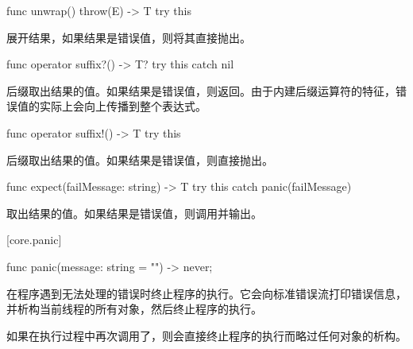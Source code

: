 \begin{itemdecl}
func unwrap() throw(E) -> T {
    try this
}
\end{itemdecl}

\pnum
{}展开结果，如果结果是错误值，则将其直接抛出。

\begin{itemdecl}
func operator suffix?() -> T? {
    try this catch { nil }
}
\end{itemdecl}

\pnum
后缀取出结果的值。如果结果是错误值，则返回。\enternote 由于内建后缀运算符的特征，错误值的实际上会向上传播到整个表达式。\exitnote

\begin{itemdecl}
func operator suffix!() -> T {
    try this
}
\end{itemdecl}

\pnum
后缀\tcode{!}取出结果的值。如果结果是错误值，则直接抛出。

\begin{itemdecl}
func expect(failMessage: string) -> T {
    try this catch { panic(failMessage) }
}
\end{itemdecl}

\pnum
{}取出结果的值。如果结果是错误值，则调用并输出。

[core.panic]{}

\begin{itemdecl}
func panic(message: string = "") -> never;
\end{itemdecl}

\pnum
{}在程序遇到无法处理的错误时终止程序的执行。它会向标准错误流打印错误信息，并析构当前线程的所有对象，然后终止程序的执行。

\pnum
如果在执行过程中再次调用了，则会直接终止程序的执行而略过任何对象的析构。